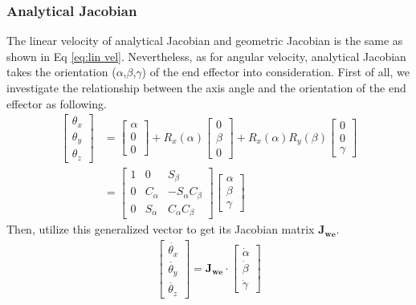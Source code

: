 \subsubsection{Analytical Jacobian}
\hspace*{6mm}The linear velocity of analytical Jacobian and geometric Jacobian is the same as shown in Eq \ref{eq:lin vel}. Nevertheless, as for angular velocity, analytical Jacobian takes the orientation ($\alpha$,$\beta$,$\gamma$) of the end effector into consideration. First of all, we investigate the relationship between the axis angle and the orientation of the end effector as following.
\begin{equation}
\begin{split}
\begin{bmatrix}
\theta _x \\ 
\theta _y \\ 
\theta _z
\end{bmatrix}
&=
\begin{bmatrix}
\alpha \\ 
0\\ 
0
\end{bmatrix}
+
R_x(\alpha)
\begin{bmatrix}
0 \\ 
\beta \\ 
0
\end{bmatrix}
+
R_x(\alpha)R_y(\beta)
\begin{bmatrix}
0 \\ 
0\\ 
\gamma
\end{bmatrix}\\
&=
\begin{bmatrix}
1 & 0 & S_\beta \\ 
0 & C_\alpha & -S_\alpha C_\beta \\ 
0 & S_\alpha & C_\alpha C_\beta
\end{bmatrix}
\begin{bmatrix}
\alpha \\ 
\beta\\ 
\gamma
\end{bmatrix}
\end{split}
\end{equation}
Then, utilize this generalized vector to get its Jacobian matrix $\mathbf{J_{we}}$.
\begin{equation}
\begin{split}
\begin{bmatrix}
\dot{\theta _x} \\ 
\dot{\theta _y} \\ 
\dot{\theta _z}
\end{bmatrix}
=
\mathbf{J_{\!we}}
\cdot
\begin{bmatrix}
\dot{\alpha} \\ 
\dot{\beta} \\ 
\dot{\gamma}
\end{bmatrix}
\end{split}
\end{equation}
